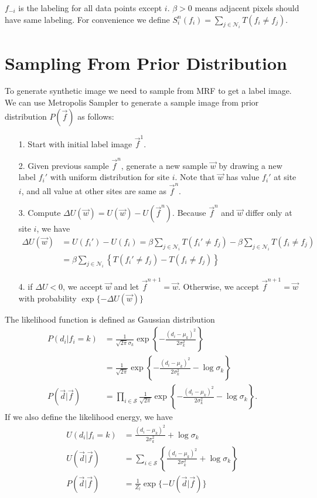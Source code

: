 \documentclass{article}
\begin{document}
$f_{-i}$ is the labeling for all data points except $i$. $\beta > 0$ means adjacent pixels should have same labeling. For convenience we define $S_i^n (f_i) = \sum_{j\in \mathcal{N}_i} T(f_i \neq f_j) $.

\section{Sampling From Prior Distribution}

To generate synthetic image we need to sample from MRF to get a label image.  We can use Metropolis Sampler to generate a sample image from prior distribution $P(\vec f)$ as follows:
\begin{itemize}
  \item[1.] Start with initial label image $\vec f^1$.
  \item[2.] Given previous sample $\vec f^{n}$, generate a new sample $\vec w$ by drawing a new label  $f_i'$  with uniform distribution for site $i$. Note that $\vec w$ has value $f_i'$ at site $i$, and all value at other sites are same as $\vec f^{n}$. 
   \item[3.] Compute $\Delta U(\vec w) = U(\vec w) - U(\vec f^n)$. Because $\vec f^{n}$ and $\vec w$ differ only at site $i$, we have
     \begin{align*}
       \Delta U(\vec w) &= U(f_i') - U(f_i) = \beta \sum_{j\in \mathcal{N}_i} T(f_i' \neq f_j)- \beta \sum_{j\in \mathcal{N}_i} T(f_i \neq f_j) \\
       &= \beta \sum_{j \in \mathcal{N}_i} \left \{  T(f_i' \neq f_j) - T(f_i \neq f_j) \right \}
     \end{align*}
     \item[4.] if $\Delta U < 0$, we accept $\vec w$ and let $\vec f^{n+1} = \vec w$. Otherwise, we accept $\vec f^{n+1} = \vec w$ with probability $\exp \{ - \Delta U(\vec w)\}$
\end{itemize}

The likelihood function is defined as Gaussian distribution
\begin{align*}
  P(d_i | f_i = k) &= \frac{1}{\sqrt{2\pi} \sigma_k}\exp \left \{ -\frac{(d_i - \mu_k)^2}{2\sigma_k^2}\right \} \\
  &= \frac{1}{\sqrt{2\pi} }\exp \left \{ -\frac{(d_i - \mu_k)^2}{2\sigma_k^2} - 
\log \sigma_k \right \} \\
P(\vec d | \vec f) &= \prod_{i \in \mathcal{S}}\frac{1}{\sqrt{2\pi} }\exp \left \{ -\frac{(d_i - \mu_k)^2}{2\sigma_k^2} - \log \sigma_k \right \} .
\end{align*}
If we also define the likelihood energy, we have
\begin{align*}
  U(d_i | f_i = k) &= \frac{(d_i - \mu_k)^2}{2\sigma_k^2} + \log \sigma_k \\
  U(\vec d | \vec f) &= \sum_{i \in \mathcal{S}} \left \{\frac{(d_i - \mu_k)^2}{2\sigma_k^2} + \log \sigma_k \right \}\\
  P(\vec d | \vec f) &= \frac{1}{Z_l}\exp \{ -U(\vec d | \vec f)\}
\end{align*}
\end{document}
